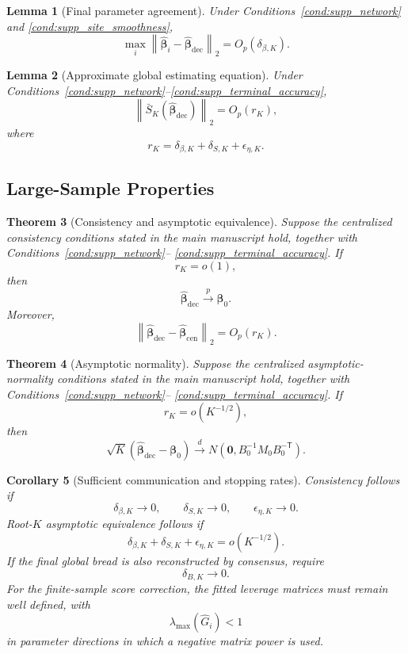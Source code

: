 \documentclass[12pt]{article}
\newtheorem{theorem}{Theorem}[section]
\newtheorem{lemma}[theorem]{Lemma}
\newtheorem{corollary}[theorem]{Corollary}
\theoremstyle{remark}
\numberwithin{equation}{section}
\newcommand{\trans}{\mathsf{T}}
\newcommand{\bbeta}{\boldsymbol{\beta}}
\newcommand{\bzero}{\mathbf 0}
\newcommand{\norm}[1]{\left\lVert#1\right\rVert}
\begin{document}
\begin{lemma}[Final parameter agreement]
\label{lem:supp_parameter_agreement}
Under Conditions~\ref{cond:supp_network} and
\ref{cond:supp_site_smoothness},
\[
\max_i
\norm{\widehat{\bbeta}_i-\widehat{\bbeta}_{\mathrm{dec}}}_2
=
O_p(\delta_{\beta,K}).
\]
\end{lemma}

\begin{lemma}[Approximate global estimating equation]
\label{lem:supp_approx_score}
Under Conditions~\ref{cond:supp_network}--\ref{cond:supp_terminal_accuracy},
\[
\norm{\bar S_K(\widehat{\bbeta}_{\mathrm{dec}})}_2
=
O_p(r_K),
\]
where
\begin{equation}
r_K
=
\delta_{\beta,K}
+
\delta_{S,K}
+
\epsilon_{\eta,K}.
\label{eq:supp_rK}
\end{equation}
\end{lemma}


\subsection{Large-Sample Properties}

\begin{theorem}[Consistency and asymptotic equivalence]
\label{thm:supp_dec_consistency}
Suppose the centralized consistency conditions stated in the main manuscript
hold, together with Conditions~\ref{cond:supp_network}--
\ref{cond:supp_terminal_accuracy}. If
\[
r_K=o(1),
\]
then
\[
\widehat{\bbeta}_{\mathrm{dec}}\xrightarrow{p}\bbeta_0.
\]
Moreover,
\[
\norm{
\widehat{\bbeta}_{\mathrm{dec}}
-
\widehat{\bbeta}_{\mathrm{cen}}
}_2
=
O_p(r_K).
\]
\end{theorem}

\begin{theorem}[Asymptotic normality]
\label{thm:supp_dec_asymptotic}
Suppose the centralized asymptotic-normality conditions stated in the main
manuscript hold, together with Conditions~\ref{cond:supp_network}--
\ref{cond:supp_terminal_accuracy}. If
\[
r_K=o(K^{-1/2}),
\]
then
\[
\sqrt K(\widehat{\bbeta}_{\mathrm{dec}}-\bbeta_0)
\xrightarrow{d}
N\left(\bzero,B_0^{-1}M_0B_0^{-\trans}\right).
\]
\end{theorem}

\begin{corollary}[Sufficient communication and stopping rates]
\label{cor:supp_rates}
Consistency follows if
\[
\delta_{\beta,K}\to0,
\qquad
\delta_{S,K}\to0,
\qquad
\epsilon_{\eta,K}\to0.
\]
Root-\(K\) asymptotic equivalence follows if
\[
\delta_{\beta,K}
+
\delta_{S,K}
+
\epsilon_{\eta,K}
=
o(K^{-1/2}).
\]
If the final global bread is also reconstructed by consensus, require
\[
\delta_{B,K}\to0.
\]
For the finite-sample score correction, the fitted leverage matrices must
remain well defined, with
\[
\lambda_{\max}(\widehat G_i)<1
\]
in parameter directions in which a negative matrix power is used.
\end{corollary}
\end{document}
